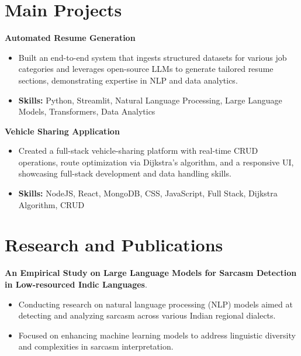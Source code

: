 \documentclass[a4paper,11pt]{article}
\begin{document}
\section{\textbf{Main Projects}}

\vspace{1mm}
  \textbf{Automated Resume Generation  }
\vspace{-1.5mm} %
\begin{itemize}
  \item Built an end-to-end system that ingests structured datasets for various job categories and leverages open-source LLMs to generate tailored resume sections, demonstrating expertise in NLP and data analytics.
\vspace{-3mm}
  \item \textbf{Skills:} Python, Streamlit, Natural Language Processing, Large Language Models, Transformers, Data Analytics
\end{itemize}


\vspace{1mm}
   \textbf{Vehicle Sharing Application }
\vspace{-1.5mm} %
\begin{itemize}
  \item Created a full-stack vehicle-sharing platform with real-time CRUD operations, route optimization via Dijkstra's algorithm, and a responsive UI, showcasing full-stack development and data handling skills.
\vspace{-3mm}
  \item \textbf{Skills:} NodeJS, React, MongoDB, CSS, JavaScript, Full Stack, Dijkstra Algorithm, CRUD
\end{itemize}



\section{\textbf{Research and Publications} \hfill }
\vspace{1mm}
  \textbf{An Empirical Study on Large Language Models for Sarcasm Detection in Low-resourced Indic Languages}.
\vspace{-1mm} %
\begin{itemize}
  \item Conducting research on natural language processing (NLP) models aimed at detecting and analyzing sarcasm across various Indian regional dialects.
\vspace{-3mm}
  \item Focused on enhancing machine learning models to address linguistic diversity and complexities in sarcasm interpretation.
\end{itemize}
\end{document}
